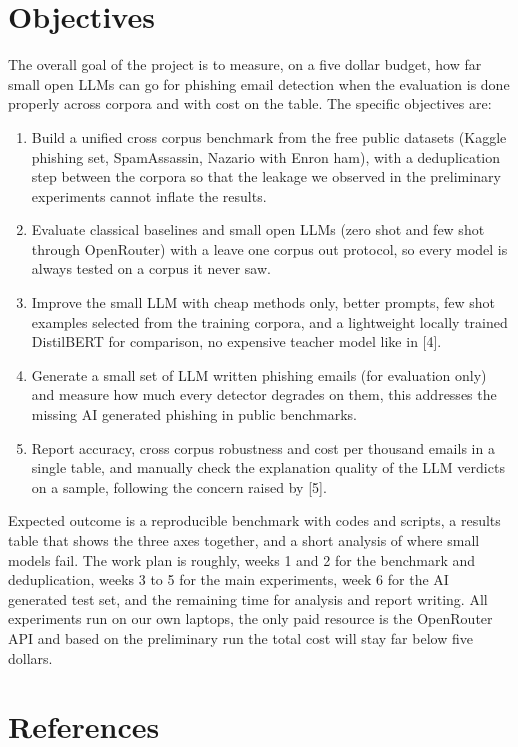\documentclass[11pt,a4paper]{article}
\begin{document}
\section{Objectives}

The overall goal of the project is to measure, on a five dollar budget, how far small open LLMs can go for phishing email detection when the evaluation is done properly across corpora and with cost on the table. The specific objectives are:

\begin{enumerate}
\item Build a unified cross corpus benchmark from the free public datasets (Kaggle phishing set, SpamAssassin, Nazario with Enron ham), with a deduplication step between the corpora so that the leakage we observed in the preliminary experiments cannot inflate the results.
\item Evaluate classical baselines and small open LLMs (zero shot and few shot through OpenRouter) with a leave one corpus out protocol, so every model is always tested on a corpus it never saw.
\item Improve the small LLM with cheap methods only, better prompts, few shot examples selected from the training corpora, and a lightweight locally trained DistilBERT for comparison, no expensive teacher model like in [4].
\item Generate a small set of LLM written phishing emails (for evaluation only) and measure how much every detector degrades on them, this addresses the missing AI generated phishing in public benchmarks.
\item Report accuracy, cross corpus robustness and cost per thousand emails in a single table, and manually check the explanation quality of the LLM verdicts on a sample, following the concern raised by [5].
\end{enumerate}

Expected outcome is a reproducible benchmark with codes and scripts, a results table that shows the three axes together, and a short analysis of where small models fail. The work plan is roughly, weeks 1 and 2 for the benchmark and deduplication, weeks 3 to 5 for the main experiments, week 6 for the AI generated test set, and the remaining time for analysis and report writing. All experiments run on our own laptops, the only paid resource is the OpenRouter API and based on the preliminary run the total cost will stay far below five dollars.

\section*{References}
\end{document}
